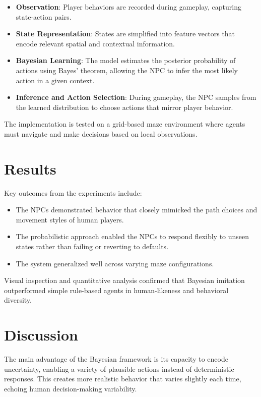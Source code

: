 \documentclass[12pt,a4paper]{article}
\begin{document}
\begin{itemize}
  \item \textbf{Observation}: Player behaviors are recorded during gameplay, capturing state-action pairs.
  \item \textbf{State Representation}: States are simplified into feature vectors that encode relevant spatial and contextual information.
  \item \textbf{Bayesian Learning}: The model estimates the posterior probability of actions using Bayes' theorem, allowing the NPC to infer the most likely action in a given context.
  \item \textbf{Inference and Action Selection}: During gameplay, the NPC samples from the learned distribution to choose actions that mirror player behavior.
\end{itemize}

The implementation is tested on a grid-based maze environment where agents must navigate and make decisions based on local observations.

\section*{Results}

Key outcomes from the experiments include:
\begin{itemize}
  \item The NPCs demonstrated behavior that closely mimicked the path choices and movement styles of human players.
  \item The probabilistic approach enabled the NPCs to respond flexibly to unseen states rather than failing or reverting to defaults.
  \item The system generalized well across varying maze configurations.
\end{itemize}

Visual inspection and quantitative analysis confirmed that Bayesian imitation outperformed simple rule-based agents in human-likeness and behavioral diversity.

\section*{Discussion}

The main advantage of the Bayesian framework is its capacity to encode uncertainty, enabling a variety of plausible actions instead of deterministic responses. This creates more realistic behavior that varies slightly each time, echoing human decision-making variability.
\end{document}
